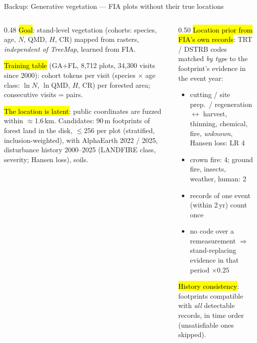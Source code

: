 \begin{frame}{Backup: Generative vegetation — FIA plots without their true locations}
\footnotesize
\begin{columns}[T]
\begin{column}{0.48\textwidth}
\hl{Goal}: stand-level vegetation (cohorts: species, age, $N$, QMD, $H$, CR) mapped from rasters, \emph{independent of TreeMap}, learned from FIA.

\medskip
\hl{Training table} (GA+FL, 8{,}712 plots, 34{,}300 visits since 2000): cohort tokens per visit (species $\times$ age class: $\ln N$, $\ln$QMD, $H$, CR) per forested area; consecutive visits = pairs.

\medskip
\hl{The location is latent}: public coordinates are fuzzed within $\approx$1.6\,km. Candidates: 90\,m footprints of forest land in the disk, $\le$256 per plot (stratified, inclusion-weighted), with AlphaEarth 2022 / 2025, disturbance history 2000–2025 (LANDFIRE class, severity; Hansen loss), soils.
\end{column}
\begin{column}{0.50\textwidth}
\hl{Location prior from FIA's own records}: TRT / DSTRB codes matched \emph{by type} to the footprint's evidence in the event year:
\begin{itemize}\setlength\itemsep{0pt}
\item cutting / site prep.\ / regeneration $\leftrightarrow$ harvest, thinning, chemical, fire, \emph{unknown}, Hansen loss: LR 4
\item crown fire: 4; ground fire, insects, weather, human: 2
\item records of one event (within 2\,yr) count once
\item no code over a remeasurement $\Rightarrow$ stand-replacing evidence in that period $\times0.25$
\end{itemize}
\hl{History consistency}: footprints compatible with \emph{all} detectable records, in time order (unsatisfiable ones skipped).

\medskip
{}
\end{column}
\end{columns}
\end{frame}

